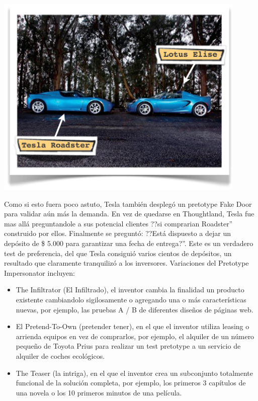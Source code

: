 \documentclass{article}
\begin{document}
\begin{enumerate}
\begin{center}
    \includegraphics[width=0.9\textwidth]{tesla}
\end{center}

Como si esto fuera poco astuto, Tesla tambi\'en despleg\'o un pretotype Fake Door para validar a\'un m\'as la demanda. En vez de quedarse en Thoughtland, Tesla fue mas all\'a preguntandole a sus potencial clientes ??si comprarian Roadster'' construido por ellos. Finalmente se pregunt\'o: ??Est\'a dispuesto a dejar un dep\'osito de \$ 5.000 para garantizar una fecha de entrega?''. Este es un verdadero test de preferencia, del que Tesla consigui\'o varios cientos de dep\'ositos, un resultado que claramente tranquiliz\'o a los inversores.
Variaciones del Pretotype Impersonator incluyen:
\begin{itemize}
\item The Infiltrator (El Infiltrado), el inventor cambia la finalidad un producto existente cambiandolo sigilosamente o agregando una o m\'as caracter\'isticas nuevas, por ejemplo, las pruebas A / B de diferentes dise\~nos de p\'aginas web.
\item El Pretend-To-Own (pretender tener), en el que el inventor utiliza leasing o arrienda equipos en vez de comprarlos, por ejemplo, el alquiler de un n\'umero peque\~no de Toyota Prius para realizar un test pretotype a un servicio de alquiler de coches ecol\'ogicos.
\item The Teaser (la intriga), en el que el inventor crea un subconjunto totalmente funcional de la soluci\'on completa, por ejemplo, los primeros 3 cap\'itulos de una novela o los 10 primeros minutos de una pel\'icula.


\end{itemize}
\end{enumerate}
\end{document}

